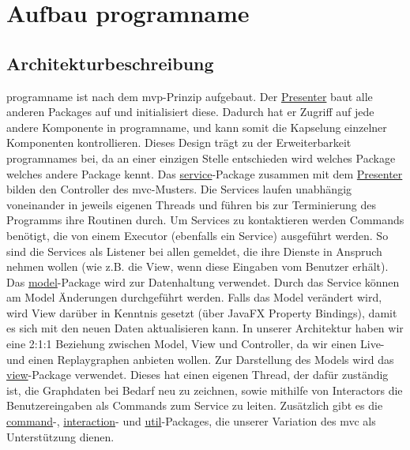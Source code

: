 \chapter{Aufbau \gls{programname}}
\label{ch:aufbau_programname}

\section{Architekturbeschreibung}

\gls{programname} ist nach dem \gls{mvp}-Prinzip aufgebaut. Der
\hyperref[subsec:presenter]{Presenter} baut alle anderen Packages auf und
initialisiert diese. Dadurch hat er Zugriff auf jede andere Komponente in \gls{programname},
und kann somit die Kapselung einzelner Komponenten kontrollieren. Dieses Design
trägt zu der Erweiterbarkeit \gls{programname}s bei, da an einer einzigen
Stelle entschieden wird welches Package welches andere Package kennt.
\newline
\newline
Das \hyperref[subsec:service]{service}-Package zusammen mit dem \hyperref[subsec:presenter]{Presenter}
bilden den Controller des \gls{mvc}-Musters. Die Services laufen unabhängig voneinander in
jeweils eigenen Threads und führen bis zur Terminierung des Programms ihre Routinen durch.
Um Services zu kontaktieren werden Commands benötigt, die von einem Executor (ebenfalls ein
Service) ausgeführt werden. So sind die Services als Listener bei allen gemeldet, die ihre
Dienste in Anspruch nehmen wollen (wie z.B. die View, wenn diese Eingaben vom Benutzer erhält).
\newline
\newline
Das \hyperref[subsec:model]{model}-Package wird zur Datenhaltung verwendet. Durch das Service
können am Model Änderungen durchgeführt werden. Falls das Model verändert wird, wird View
darüber in Kenntnis gesetzt (über JavaFX Property Bindings), damit es sich mit den neuen Daten
aktualisieren kann. In unserer Architektur haben wir eine 2:1:1 Beziehung zwischen Model,
View und Controller, da wir einen Live- und einen Replaygraphen anbieten wollen.
\newline
\newline
Zur Darstellung des Models wird das \hyperref[subsec:view]{view}-Package verwendet. Dieses
hat einen eigenen Thread, der dafür zuständig ist, die Graphdaten bei Bedarf neu zu zeichnen,
sowie mithilfe von Interactors die Benutzereingaben als Commands zum Service zu leiten.
\newline
\newline
Zusätzlich gibt es die \hyperref[subsec:command]{command}-, \hyperref[subsec:interaction]{interaction}-
und \hyperref[subsec:util]{util}-Packages, die unserer Variation des \gls{mvc} als Unterstützung dienen.


